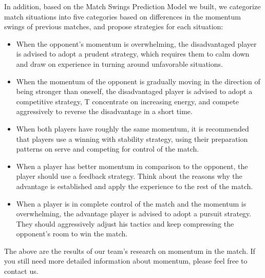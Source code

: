 \documentclass[12pt]{article}  %
\begin{document}
\begin{memo}[Memorandum]
	In addition, based on the Match Swings Prediction Model we built, we categorize match situations into five categories based on differences in the momentum swings of previous matches, and propose strategies for each situation:
	\begin{itemize}
		\setlength{\parsep}{0ex} 
		\setlength{\topsep}{2ex} 
		\setlength{\itemsep}{1ex} 
		\item When the opponent's momentum is overwhelming, the disadvantaged player is advised to adopt a prudent strategy, which requires them to calm down and draw on experience in turning around unfavorable situations.
		\item When the momentum of the opponent is gradually moving in the direction of being stronger than oneself, the disadvantaged player is advised to adopt a competitive strategy, T concentrate on increasing energy, and compete aggressively to reverse the disadvantage in a short time.
		\item When both players have roughly the same momentum, it is recommended that players use a winning with stability strategy, using their preparation patterns on serve and competing for control of the match.
		\item When a player has better momentum in comparison to the opponent, the player should use a feedback strategy. Think about the reasons why the advantage is established and apply the experience to the rest of the match. 
		\item When a player is in complete control of the match and the momentum is overwhelming, the advantage player is advised to adopt a pursuit strategy. They should aggressively adjust his tactics and keep compressing the opponent's room to win the match.
	\end{itemize}
	
	The above are the results of our team's research on momentum in the match. If you still need more detailed information about momentum, please feel free to contact us.
	
\end{memo}
\end{document}
